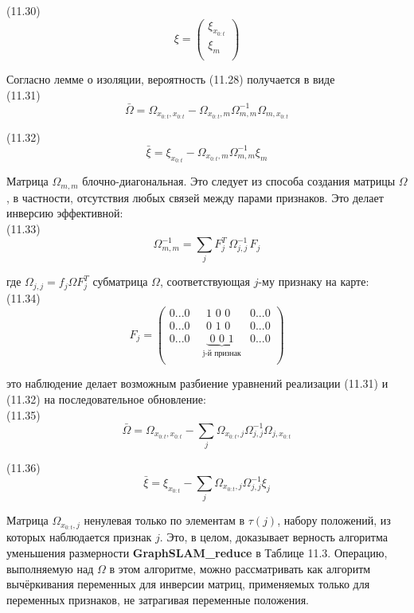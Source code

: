 \documentclass[10pt,a4paper]{article}
\begin{document}
(11.30)
$$\xi=\left(\begin{array}{c}\xi_{x_{0:t}}\\\xi_m\\
\end{array} \right)$$

Согласно лемме о изоляции, вероятность (11.28) получается в виде\\

(11.31)
$$\bar{\varOmega}=\varOmega_{x_{0:t},x_{0:t}}-\varOmega_{x_{0:t},m}\varOmega_{m,m}^{-1}\varOmega_{m,x_{0:t}}$$

(11.32)
$$\bar{\xi}=\xi_{x_{0:t}}-\varOmega_{x_{0:t},m}\varOmega_{m,m}^{-1}\xi_m$$

Матрица  $\varOmega_{m,m}$ блочно-диагональная. Это следует из способа создания матрицы $\varOmega$, в частности, отсутствия любых связей между парами признаков. Это делает инверсию эффективной:\\

(11.33)
$$\varOmega_{m,m}^{-1}=\sum_j F_j^T\,\varOmega_{j,j}^{-1}\,F_j$$

где $\varOmega_{j,j}=f_j\varOmega F_j^T$ субматрица $\varOmega$, соответствующая $j$-му признаку на карте:\\

(11.34)
$$F_j=\left(\begin{array}{ccc}0...0\,\,&\,\,1\,\,0\,\,0\,\,&0...0\\
0...0\,\,&\,\,0\,\,1\,\,0\,\,&0...0\\
0...0\,\,&\underbrace{\,\,0\,\,0\,\,1\,\,}_{\text{j-й признак}}&0...0\\
\end{array} \right)$$

это наблюдение делает возможным разбиение уравнений реализации (11.31) и (11.32) на последовательное обновление:\\

(11.35)
$$\bar{\varOmega}=\varOmega_{x_{0:t},x_{0:t}}-\sum_j\varOmega_{x_{0:t},j}\varOmega_{j,j}^{-1}\varOmega_{j,x_{0:t}}$$

(11.36)
$$\bar{\xi}=\xi_{x_{0:t}}-\sum_j\varOmega_{x_{0:t},j}\varOmega_{j,j}^{-1}\xi_j$$

Матрица $\varOmega_{x_{0:t},j}$ ненулевая только по элементам в $\tau(j)$, набору положений, из которых наблюдается признак $j$. Это, в целом, доказывает верность алгоритма уменьшения размерности \textbf{GraphSLAM\_reduce} в Таблице 11.3. Операцию, выполняемую над $\varOmega$ в этом алгоритме, можно рассматривать как алгоритм вычёркивания переменных для инверсии матриц, применяемых только для переменных признаков, не затрагивая переменные положения.\\
\end{document}
